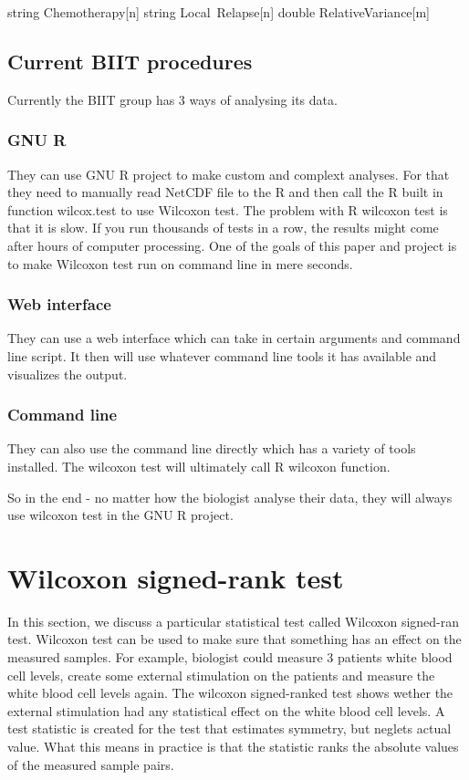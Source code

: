 \documentclass[12pt]{article}
\begin{document}
string Chemotherapy[n]
string Local\ Relapse[n]
double RelativeVariance[m]

\subsection{Current BIIT procedures}
Currently the BIIT group has 3 ways of analysing its data.
\subsubsection{GNU R}
They can use GNU R project to make custom and complext analyses. For that they need to manually read NetCDF file to the R and then call the R built in function wilcox.test to use Wilcoxon test. The problem with R wilcoxon test is that it is slow. If you run thousands of tests in a row, the results might come after hours of computer processing. One of the goals of this paper and project is to make Wilcoxon test run on command line in mere seconds.
\subsubsection{Web interface}
They can use a web interface which can take in certain arguments and command line script. It then will use whatever command line tools it has available and visualizes the output.

\subsubsection{Command line}
They can also use the command line directly which has a variety of tools installed. The wilcoxon test will ultimately call R wilcoxon function.

So in the end - no matter how the biologist analyse their data, they will always use wilcoxon test in the GNU R project.

\newpage

\section{Wilcoxon signed-rank test}

In this section, we discuss a particular statistical test called Wilcoxon signed-ran test. Wilcoxon test can be used to make sure that something has an effect on the measured samples. For example, biologist could measure 3 patients white blood cell levels, create some external stimulation on the patients and measure the white blood cell levels again. The wilcoxon signed-ranked test shows wether the external stimulation had any statistical effect on the white blood cell levels.
A test statistic is created for the test that estimates symmetry, but neglets actual value. What this means in practice is that the statistic ranks the absolute values of the measured sample pairs.
\end{document}
